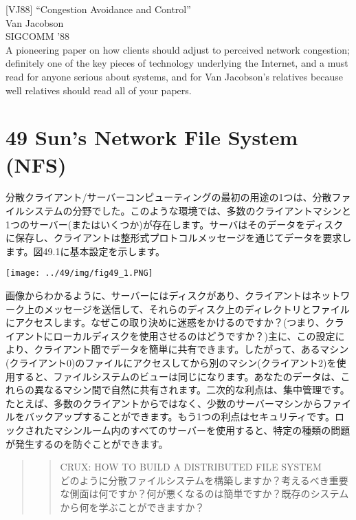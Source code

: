 {[}VJ88{]} ``Congestion Avoidance and Control''\\
Van Jacobson\\
SIGCOMM '88\\
A pioneering paper on how clients should adjust to perceived network
congestion; definitely one of the key pieces of technology underlying
the Internet, and a must read for anyone serious about systems, and for
Van Jacobson's relatives because well relatives should read all of your
papers.

\hypertarget{suns-network-file-system-nfs}{%
\section*{49 Sun's Network File System
(NFS)}\label{suns-network-file-system-nfs}}

分散クライアント/サーバーコンピューティングの最初の用途の1つは、分散ファイルシステムの分野でした。このような環境では、多数のクライアントマシンと1つのサーバー(またはいくつか)が存在します。サーバはそのデータをディスクに保存し、クライアントは整形式プロトコルメッセージを通じてデータを要求します。図49.1に基本設定を示します。

\texttt{[image: ../49/img/fig49\_1.PNG]}

画像からわかるように、サーバーにはディスクがあり、クライアントはネットワーク上のメッセージを送信して、それらのディスク上のディレクトリとファイルにアクセスします。なぜこの取り決めに迷惑をかけるのですか？(つまり、クライアントにローカルディスクを使用させるのはどうですか？)主に、この設定により、クライアント間でデータを簡単に共有できます。したがって、あるマシン(クライアント0)のファイルにアクセスしてから別のマシン(クライアント2)を使用すると、ファイルシステムのビューは同じになります。あなたのデータは、これらの異なるマシン間で自然に共有されます。二次的な利点は、集中管理です。たとえば、多数のクライアントからではなく、少数のサーバーマシンからファイルをバックアップすることができます。もう1つの利点はセキュリティです。ロックされたマシンルーム内のすべてのサーバーを使用すると、特定の種類の問題が発生するのを防ぐことができます。

\begin{quote}
\begin{quote}
CRUX: HOW TO BUILD A DISTRIBUTED FILE SYSTEM\\
どのように分散ファイルシステムを構築しますか？考えるべき重要な側面は何ですか？何が悪くなるのは簡単ですか？既存のシステムから何を学ぶことができますか？
\end{quote}
\end{quote}

